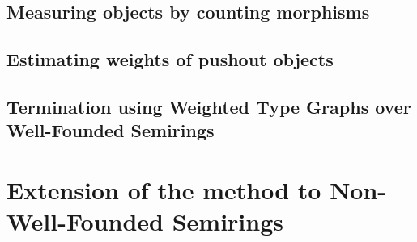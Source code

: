 \documentclass{report}
\begin{document}
\subsection{Measuring objects by counting morphisms}
\label{sec:type_graph:measuring_graphs}


%  
  
\subsection{Estimating weights of pushout objects} 
\label{sec:type_graph:weighing_pushout} 
  


\subsection{Termination using Weighted Type Graphs over Well-Founded Semirings}
\label{sec:type_graph:termination}
   
  
\section{Extension of the method to Non-Well-Founded Semirings}


\end{document}
